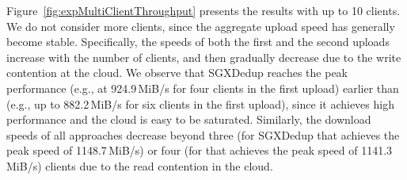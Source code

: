 \begin{figure}[t]
\begin{minipage}[t]{0.4\textwidth}
        \hspace{15pt}
        \vspace{2pt}
        \label{tab:expCloudTest}
      \end{minipage}
\end{figure}

Figure~\ref{fig:expMultiClientThroughput} presents the results with up to 10 clients. We do not consider more clients, since the aggregate upload speed has  generally become stable. Specifically, the speeds of both the first and the second uploads  increase with the number of clients, and then gradually decrease due to the write contention at the cloud. We observe that SGXDedup reaches the peak performance (e.g., at 924.9\,MiB/s for four clients in the first upload) earlier than \prototype (e.g., up to 882.2\,MiB/s for six clients in the first upload), since it achieves high performance and the cloud is easy to be saturated. Similarly, the download speeds of all approaches decrease beyond three (for SGXDedup that achieves the peak speed of 1148.7\,MiB/s) or four (for \prototype that achieves the peak speed of 1141.3\,MiB/s) clients due to the read contention in the cloud.



